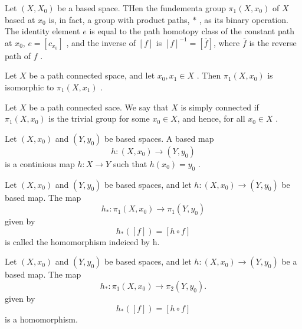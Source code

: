 \documentclass{article}
\theoremstyle{remark}
\begin{document}
\begin{theorem}
    Let $\left( X, X_{0} \right)$ be a based space. THen the fundementa group $\pi _{1} \left( X, x_{0} \right)$ of $X$
    based at $x_{0}$  is, in fact, a group with product paths, $*$ , as its binary operation. The identity element $e$
    is equal to the path homotopy class of the constant path at $x_{0}$, $e = \left[ c_{x_{0}} \right]$ , and the
    inverse of $\left[ f \right]$ is $\left[ f \right]^{-1}= \left[ \overline{f}  \right]$, where $\overline{f} $ is the
    reverse path of $f$ .
\end{theorem}

\begin{theorem}
    Let $X$ be a path connected space, and let $x_{0}, x_{1} \in X$ . Then $\pi _{1}\left( X, x_{0} \right)$ is
    isomorphic to $\pi _{1}\left( X, x_{1} \right)$ .
\end{theorem}

\begin{definition}
    Let $X$  be a path connected sace. We say that $X$ is simply connected if $\pi _{1}\left( X, x_{0} \right)$ is the
    trivial group for some $x_{0} \in  X$, and hence, for all $x_{0} \in X$ .
\end{definition}

\begin{definition}
    Let $\left( X, x_{0} \right)$ and $\left( Y, y_{0} \right)$ be based spaces. A based map \[
    h: \left( X, x_{0} \right) \to \left( Y,y_{0} \right)
    \] is a continious map $h: X \to Y$ such that $h\left( x_{0} \right) = y_{0}$ .
\end{definition}

\begin{definition}
    Let $\left( X, x_{0} \right) $  and $\left( Y, y_{0} \right)$ be based spaces, and let $h: \left( X, x_{0} \right)
    \to  \left( Y , y_{0} \right)$ be based map.  The map \[
        h_{*} : \pi _{1}\left( X, x_{0} \right)  \to \pi _{1}\left( Y , y_{0} \right)
    \] given by \[
    h_{*}\left( \left[ f \right] \right) = \left[ h \circ f \right]
    \] is called the homomorphism indeiced by h.
\end{definition}

\begin{lemma}
    Let $\left( X, x_{0}\right)$   and $\left( Y ,y_{0} \right)$  be based spaces, and let $h: \left( X, x_{0} \right) \to
    \left( Y ,y_{0} \right)$  be a based map. The map \[
    h_{*} : \pi _{1} \left( X, x_{0} \right)  \to \pi _{2} \left( Y ,y_{0} \right).
    \]
    given by \[
    h_{*} \left( \left[ f \right] \right) =  \left[ h \circ f \right]
    \] is a homomorphism.
\end{lemma}
\end{document}
